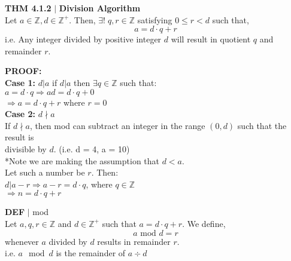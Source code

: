 \documentclass [12pt]{article}
\begin{document}
\begin{framed}
\textbf{THM 4.1.2} $|$ \textbf{Division Algorithm }\\
\vspace{0.5cm}
Let $a\in \mathbb{Z}, d \in \mathbb{Z}^{+}$. Then, $\exists! \; q, r \in \mathbb{Z}$ satisfying $0 \leq r < d$ such that, \\
\[ a = d\cdot q +r\]
i.e. Any integer divided by positive integer $d$ will result in quotient $q$ and remainder $r$.
\end{framed}
\vspace{0.10in}
\textbf{PROOF:}\\
\quad\textbf{Case 1:} $d|a$
\quad\quad if $d|a$ then $\exists q \in \mathbb{Z}$ such that:\\
\quad\quad$a = d\cdot q \Rightarrow ad = d\cdot q + 0$\\
\quad\quad$\Rightarrow a = d \cdot q + r$ where $r = 0$ \checkmark\\
\vspace{0.1in}
\quad\textbf{Case 2:} $d\nmid a$\\
\quad\quad If $d\nmid a$, then mod can subtract an integer in the range $(0,d)$ such that the result is\\
\quad\quad divisible by $d$. (i.e. d = 4, a = 10)\\
\quad\quad **Note we are making the assumption that $d<a$.\\
\quad\quad Let such a number be $r$. Then:\\
\quad\quad\quad $d|a - r \Rightarrow a - r = d \cdot q$, where $q\in\mathbb{Z}$\\
\quad\quad\quad $\Rightarrow n=d\cdot q + r$ \checkmark\\
\vspace{0.25in}

\begin{framed}
\textbf{DEF} $|$ mod \\
Let $a, q, r \in \mathbb{Z}$ and $d \in \mathbb{Z}^{+}$ such that $a = d\cdot q + r$. We define, \\
\[a \text{ mod } d = r\]
whenever $a$ divided by $d$ results in remainder $r$.\\
i.e. $a \mod d$ is the remainder of $a \div d$
\end{framed}
\end{document}
